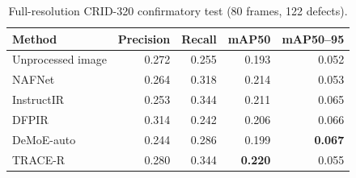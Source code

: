 \begin{table}[!t]
\centering
\caption{Full-resolution CRID-320 confirmatory test (80 frames, 122 defects).}
\label{tab:crid}
\scriptsize
\begin{tabular}{lrrrr}
\toprule
Method & Precision & Recall & mAP50 & mAP50--95 \\
\midrule
Unprocessed image & 0.272 & 0.255 & 0.193 & 0.052 \\
NAFNet & 0.264 & 0.318 & 0.214 & 0.053 \\
InstructIR & 0.253 & 0.344 & 0.211 & 0.065 \\
DFPIR & 0.314 & 0.242 & 0.206 & 0.066 \\
DeMoE-auto & 0.244 & 0.286 & 0.199 & \textbf{0.067} \\
TRACE-R & 0.280 & 0.344 & \textbf{0.220} & 0.055 \\
\bottomrule
\end{tabular}
\end{table}
